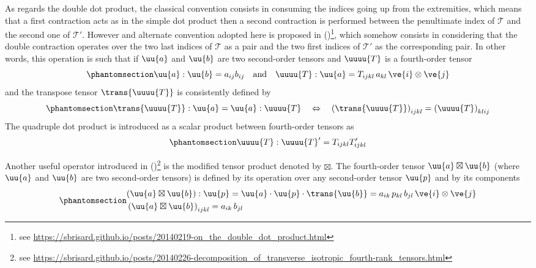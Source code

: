\documentclass[
  letterpaper,
  DIV=11,
  numbers=noendperiod]{scrreprt}
\begin{document}
As regards the double dot product, the classical convention consists in
consuming the indices going up from the extremities, which means that a
first contraction acts as in the simple dot product then a second
contraction is performed between the penultimate index of
\(\mathcal{T}\) and the second one of \(\mathcal{T}'\). However and
alternate convention adopted here is proposed in
()\footnote{see
  \url{https://sbrisard.github.io/posts/20140219-on_the_double_dot_product.html}},
which somehow consists in considering that the double contraction
operates over the two last indices of \(\mathcal{T}\) as a pair and the
two first indices of \(\mathcal{T}'\) as the corresponding pair. In
other words, this operation is such that if \(\uu{a}\) and \(\uu{b}\)
are two second-order tensors and \(\uuuu{T}\) is a fourth-order tensor
\begin{equation}\phantomsection\label{eq-doubledot}{
\uu{a}:\uu{b}=a_{ij}b_{ij}
\quad\textrm{and}\quad
\uuuu{T}:\uu{a}=T_{ijkl}\, a_{kl}\, \ve{i}\otimes\ve{j}
}\end{equation} and the transpose tensor \(\trans{\uuuu{T}}\) is
consistently defined by
\begin{equation}\phantomsection\label{eq-trans4}{
\trans{\uuuu{T}}:\uu{a}=\uu{a}:\uuuu{T}
\quad\Leftrightarrow\quad
\left(\trans{\uuuu{T}}\right)_{ijkl}=\left(\uuuu{T}\right)_{klij}
}\end{equation} The quadruple dot product is introduced as a scalar
product between fourth-order tensors as
\begin{equation}\phantomsection\label{eq-dot4}{
\uuuu{T}:\uuuu{T}'=T_{ijkl} T'_{ijkl}
}\end{equation}

Another useful operator introduced in
()\footnote{see
  \url{https://sbrisard.github.io/posts/20140226-decomposition_of_transverse_isotropic_fourth-rank_tensors.html}}
is the modified tensor product denoted by \(\boxtimes\). The
fourth-order tensor \(\uu{a}\boxtimes\uu{b}\) (where \(\uu{a}\) and
\(\uu{b}\) are two second-order tensors) is defined by its operation
over any second-order tensor \(\uu{p}\) and by its components
\begin{equation}\phantomsection\label{eq-boxtimes}{\begin{aligned}
& (\uu{a}\boxtimes\uu{b}):\uu{p}=\uu{a}\cdot\uu{p}\cdot\trans{\uu{b}}
=a_{ik}\,p_{kl}\,b_{jl}\,\ve{i}\otimes\ve{j}
\\
& \left(\uu{a}\boxtimes\uu{b}\right)_{ijkl}=a_{ik}\,b_{jl}
\end{aligned}}\end{equation}
\end{document}
